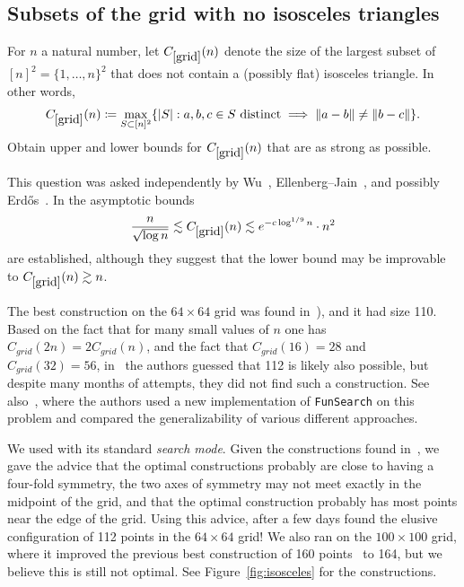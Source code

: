 \subsection{Subsets of the grid with no isosceles triangles}

\renewcommand{\problemURL}{https://google-deepmind.github.io/alphaevolve_repository_of_problems/problems/59.html}

\begin{problem}\label{grid} For $n$ a natural number, let $C_{\ref{grid}}(n)$ denote the size of the largest subset of $[n]^2 = \{1,\dots,n\}^2$ that does not contain a (possibly flat) isosceles triangle.  In other words,
$$C_{\ref{grid}}(n) \coloneqq \max_{S\subset [n]^2}\{|S|: a,b,c\in S \text{ distinct} \implies \|a-b\| \neq \|b-c\|\}.$$
Obtain upper and lower bounds for $C_{\ref{grid}}(n)$ that are as strong as possible.
\end{problem}

This question was asked independently by Wu~\cite{wu2016counting}, Ellenberg--Jain~\cite{ellenberg2019convergence}, and possibly Erd\H{o}s~\cite{solymosierdos}.  In \cite{charton2024patternboost} the asymptotic bounds
$$ \frac{n}{\sqrt{\log n}} \lesssim C_{\ref{grid}}(n)\lesssim e^{-c\log^{1/9}n}\cdot n^2$$
are established, although they suggest that the lower bound may be improvable to $C_{\ref{grid}}(n) \gtrsim n$.


The best construction on the $64\times 64$ grid was found in~\cite{charton2024patternboost}), and it had size 110. Based on the fact that for many small values of $n$ one has $C_{grid}(2n)=2C_{grid}(n)$, and the fact that $C_{grid}(16)=28$ and $C_{grid}(32)=56$, in~\cite{charton2024patternboost} the authors guessed that 112 is likely also possible, but despite many months of attempts, they did not find such a construction. See also~\cite{ellenberg2025generative}, where the authors used a new implementation of \texttt{FunSearch} on this problem and compared the generalizability of various different approaches.

We used \AlphaEvolve with its standard \emph{search mode}. Given the constructions found in~\cite{charton2024patternboost}, we gave \AlphaEvolve the advice that the optimal constructions probably are close to having a four-fold symmetry,  the two axes of symmetry may not meet exactly in the midpoint of the grid, and that the optimal construction probably has most points near the edge of the grid. Using this advice, after a few days \AlphaEvolve found the elusive configuration of 112 points in the $64\times 64$ grid! We also ran \AlphaEvolve on the $100\times 100$ grid, where it improved the previous best construction of 160 points~\cite{charton2024patternboost} to 164, but we believe this is still not optimal. See Figure~\ref{fig:isosceles} for the constructions.




